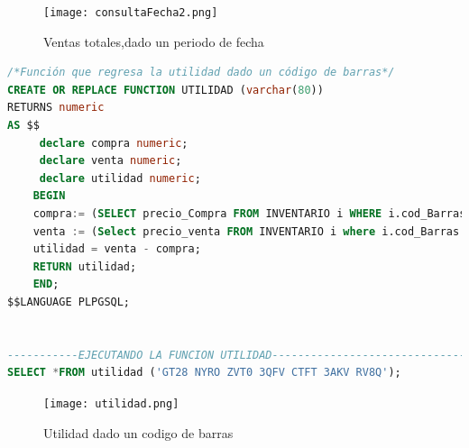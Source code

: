 \documentclass[30pt,fleqn]{article}
\begin{document}
\vspace{5mm} %

\begin{figure}[h]
    \centering
    \texttt{[image: consultaFecha2.png]}
    \caption{Ventas totales,dado un periodo de fecha}
    \label{fig:Ventas totales,dado un periodo de fecha}
\end{figure}

\vspace{15mm} %




\begin{lstlisting}[language=sql, caption={Función que regresa la utilidad dado un código de barras}]
/*Función que regresa la utilidad dado un código de barras*/
CREATE OR REPLACE FUNCTION UTILIDAD (varchar(80))
RETURNS numeric
AS $$
     declare compra numeric;
	 declare venta numeric;
	 declare utilidad numeric;
    BEGIN
    compra:= (SELECT precio_Compra FROM INVENTARIO i WHERE i.cod_Barras = $1);
    venta := (Select precio_venta FROM INVENTARIO i where i.cod_Barras = $1);
	utilidad = venta - compra;
	RETURN utilidad;
	END;
$$LANGUAGE PLPGSQL;

  
-----------EJECUTANDO LA FUNCION UTILIDAD-----------------------------------
SELECT *FROM utilidad ('GT28 NYRO ZVT0 3QFV CTFT 3AKV RV8Q');


\end{lstlisting}

\vspace{5mm} %

\begin{figure}[h]
    \centering
    \texttt{[image: utilidad.png]}
    \caption{Utilidad dado un codigo de barras}
    \label{fig:Tabla Registrar}
\end{figure}


\vspace{5mm} %
\end{document}
